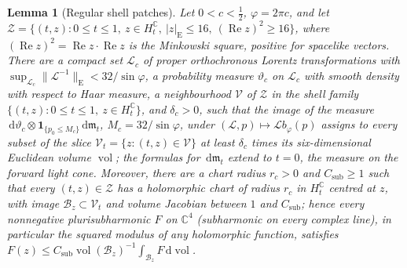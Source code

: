 \documentclass[aps,prl,reprint,longbibliography,raggedbottom]{revtex4-2}
\newtheorem{lemma}{Lemma}
\newcommand{\C}{\mathbb C}
\newcommand{\dd}{\,\mathrm d}
\newcommand{\norm}[1]{\lVert #1\rVert}
\newcommand{\abs}[1]{\lvert #1\rvert}
\DeclareMathOperator{\Rea}{Re}
\DeclareMathOperator{\vol}{vol}
\begin{document}
\begin{lemma}[Regular shell patches]\label{lem:regular-patches}
Let $0<c<\frac12$, $\varphi=2\pi c$, and let
$\mathscr Z=\{(t,z):0\le t\le1,\ z\in H_t^{\C},\ \abs z_{\mathrm E}\le16,\ (\Rea z)^2\ge16\}$,
where $(\Rea z)^2=\Rea z\cdot\Rea z$ is the Minkowski square, positive
for spacelike vectors. There are a compact set
$\mathscr L_c$ of proper orthochronous Lorentz transformations with
$\sup_{\mathscr L_c}\norm{\mathcal L^{-1}}_{\mathrm E}<32/\sin\varphi$, a
probability measure $\vartheta_c$ on $\mathscr L_c$ with smooth density
with respect to Haar measure, a
neighbourhood $\mathcal V$ of $\mathscr Z$ in the shell family
$\{(t,z):0\le t\le1,\ z\in H_t^{\C}\}$, and $\delta_c>0$, such that
the image of the measure
$\dd\vartheta_c\otimes\mathbf 1_{\{p_0\le M_c\}}\dd\mathfrak m_t$,
$M_c=32/\sin\varphi$, under $(\mathcal L,p)\mapsto\mathcal Lb_\varphi(p)$
assigns to every subset of the slice
$\mathcal V_t=\{z:(t,z)\in\mathcal V\}$ at least $\delta_c$ times its
six-dimensional Euclidean volume $\vol$; the formulas for
$\dd\mathfrak m_t$ extend to $t=0$, the measure on the forward light
cone. Moreover, there are a chart radius $r_c>0$ and
$C_{\mathrm{sub}}\ge1$ such that every $(t,z)\in\mathscr Z$ has a
holomorphic chart of radius $r_c$ in $H_t^{\C}$ centred at $z$, with
image $\mathcal B_z\subset\mathcal V_t$ and volume Jacobian between $1$
and $C_{\mathrm{sub}}$; hence every nonnegative plurisubharmonic $F$
on $\C^4$ (subharmonic on every complex line), in particular
the squared modulus of any holomorphic function, satisfies
$F(z)\le C_{\mathrm{sub}}\vol(\mathcal B_z)^{-1}\int_{\mathcal B_z}F\dd\vol$.
\end{lemma}
\end{document}
